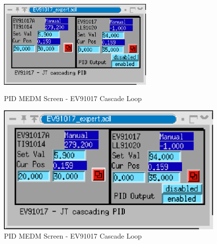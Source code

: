 \begin{figure}[h!]
\begin{latexonly}
\centering
\includegraphics[width=3in]{beamline/ev91017_cascade.eps}
\caption{PID MEDM Screen - EV91017 Cascade Loop}
\label{fig:ev17c}
\end{latexonly}
\begin{htmlonly}
\includegraphics{beamline/ev91017_cascade.eps}
\caption{PID MEDM Screen - EV91017 Cascade Loop}
\label{fig:ev17c}
\end{htmlonly}
\end{figure}


